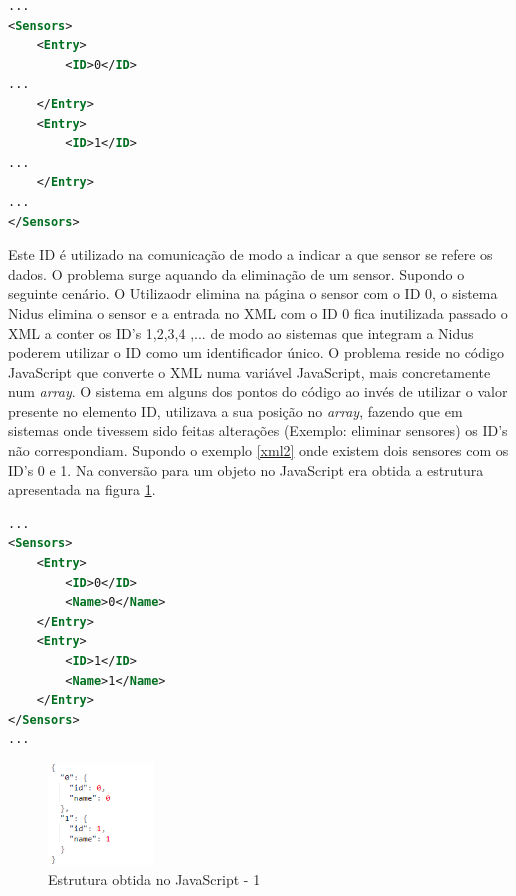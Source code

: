 \begin{lstlisting}[caption=Estrutura parcial do XML da Nidus(Sensores),label={xml1},language=XML]
...
<Sensors>
    <Entry>
        <ID>0</ID>
...
    </Entry>
    <Entry>
        <ID>1</ID>
...
    </Entry>
...
</Sensors>
\end{lstlisting}




\par Este ID é utilizado na comunicação de modo a indicar a que sensor se refere os dados. O problema surge aquando da eliminação de um sensor. Supondo o seguinte cenário. O Utilizaodr elimina na página o sensor com o ID 0, o sistema Nidus elimina o sensor e a entrada no XML com o ID 0 fica inutilizada passado o XML a conter os ID's 1,2,3,4 ,... de modo ao sistemas que integram a Nidus poderem utilizar o ID como um identificador único. O problema reside no código JavaScript que converte o XML numa variável JavaScript, mais concretamente num \textit{array}. O sistema em alguns dos pontos do código ao invés de utilizar o valor presente no elemento ID, utilizava a sua posição no \textit{array}, fazendo que em sistemas onde tivessem sido feitas alterações (Exemplo: eliminar sensores) os ID's não correspondiam. Supondo o exemplo \ref{xml2} onde existem dois sensores com os ID's 0 e 1. Na conversão para um objeto no JavaScript era obtida a estrutura apresentada na figura \ref{estruct1}.

\begin{lstlisting}[caption=Exemplo do XML antes da eliminação de Sensores,label={xml2},language=XML]
...
<Sensors>
    <Entry>
        <ID>0</ID>
        <Name>0</Name>
    </Entry>
    <Entry>
        <ID>1</ID>
        <Name>1</Name>
    </Entry>
</Sensors>
...
\end{lstlisting}

\begin{figure}[ht]
\centering
\includegraphics[width=0.25\textwidth]{images/estructu1.png}
\caption{Estrutura obtida no JavaScript - 1}\label{estruct1}
\end{figure}

